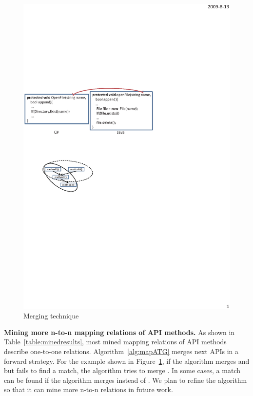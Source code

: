 \begin{figure}[t]
\centering
\includegraphics[scale=1,clip]{figure/n2n.eps}\vspace*{-3ex}
 \caption{Merging technique}\vspace*{-3.5ex}
 \label{fig:n2n}
\end{figure}
\textbf{Mining more n-to-n mapping relations of API methods.} As
shown in Table~\ref{table:minedresults}, most mined mapping
relations of API methods describe one-to-one relations.
Algorithm~\ref{alg:mapATG} merges next APIs in a forward strategy.
For the example shown in Figure~\ref{fig:n2n}, if the algorithm
merges  and  but fails to find a
match, the algorithm tries to merge . In some
cases, a match can be found if the algorithm merges
 instead of . We plan to refine
the algorithm so that it can mine more n-to-n relations in future
work.

